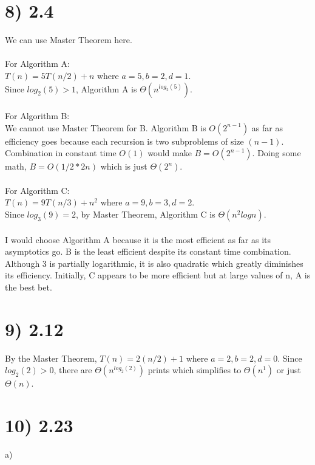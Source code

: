 \documentclass[a4paper]{article}
\begin{document}
\section*{8) 2.4}
We can use Master Theorem here.\\
\\
For Algorithm A:\\
$T(n) = 5T(n/2) + n$ where
$a=5, b=2, d=1$.\\
Since $log_2 (5) > 1$, Algorithm A is $\Theta(n^{log_2(5)})$.
\\
\\
For Algorithm B:\\
We cannot use Master Theorem for B. Algorithm B is $O(2^{n-1})$ as far as efficiency goes because each recursion is two subproblems of size $(n-1)$. Combination in constant time $O(1)$ would make $B = O(2^{n-1})$. Doing some math, $B = O(1/2*2{n})$ which is just $\Theta(2^{n})$.
\\
\\
For Algorithm C:\\
$T(n) = 9T(n/3) + n^2$ where
$a=9, b=3, d=2$.\\
Since $log_3(9) = 2$, by Master Theorem, Algorithm C is $\Theta(n^{2}logn)$.
\\
\\
I would choose Algorithm A because it is the most efficient as far as its asymptotics go. B is the least efficient despite its constant time combination. Although 3 is partially logarithmic, it is also quadratic which greatly diminishes its efficiency. Initially, C appears to be more efficient but at large values of n, A is the best bet.



\section*{9) 2.12}
By the Master Theorem,
$T(n) = 2(n/2) + 1$ where
$a=2, b=2, d=0$.
Since $log_2(2) > 0$, there are $\Theta(n^{log_2(2)})$ prints which simplifies to $\Theta(n^{1})$ or just $\Theta(n)$.


\section*{10) 2.23}

a) 
\end{document}
